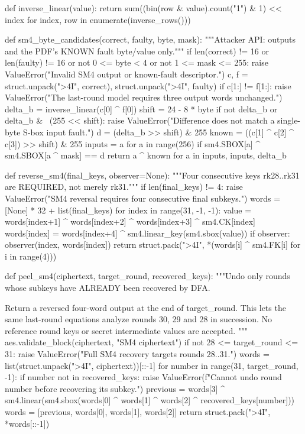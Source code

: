 \begin{lightcode}[numbers=left,firstnumber=1]
def inverse_linear(value):
    return sum((bin(row & value).count("1") & 1) << index for index, row in enumerate(inverse_rows()))


def sm4_byte_candidates(correct, faulty, byte, mask):
    """Attacker API: outputs and the PDF's KNOWN fault byte/value only."""
    if len(correct) != 16 or len(faulty) != 16 or not 0 <= byte < 4 or not 1 <= mask <= 255:
        raise ValueError("Invalid SM4 output or known-fault descriptor.")
    c, f = struct.unpack(">4I", correct), struct.unpack(">4I", faulty)
    if c[1:] != f[1:]:
        raise ValueError("The last-round model requires three output words unchanged.")
    delta_b = inverse_linear(c[0] ^ f[0])
    shift = 24 - 8 * byte
    if not delta_b or delta_b & ~(255 << shift):
        raise ValueError("Difference does not match a single-byte S-box input fault.")
    d = (delta_b >> shift) & 255
    known = ((c[1] ^ c[2] ^ c[3]) >> shift) & 255
    inputs = {a for a in range(256) if sm4.SBOX[a] ^ sm4.SBOX[a ^ mask] == d}
    return {a ^ known for a in inputs}, inputs, delta_b


def reverse_sm4(final_keys, observer=None):
    """Four consecutive keys rk28..rk31 are REQUIRED, not merely rk31."""
    if len(final_keys) != 4:
        raise ValueError("SM4 reversal requires four consecutive final subkeys.")
    words = [None] * 32 + list(final_keys)
    for index in range(31, -1, -1):
        value = words[index+1] ^ words[index+2] ^ words[index+3] ^ sm4.CK[index]
        words[index] = words[index+4] ^ sm4.linear_key(sm4.sbox(value))
        if observer:
            observer(index, words[index])
    return struct.pack(">4I", *(words[i] ^ sm4.FK[i] for i in range(4)))


def peel_sm4(ciphertext, target_round, recovered_keys):
    """Undo only rounds whose subkeys have ALREADY been recovered by DFA.

    Return a reversed four-word output at the end of target_round. This lets
    the same last-round equations analyze rounds 30, 29 and 28 in succession.
    No reference round keys or secret intermediate values are accepted.
    """
    aes.validate_block(ciphertext, "SM4 ciphertext")
    if not 28 <= target_round <= 31:
        raise ValueError("Full SM4 recovery targets rounds 28..31.")
    words = list(struct.unpack(">4I", ciphertext))[::-1]
    for number in range(31, target_round, -1):
        if number not in recovered_keys:
            raise ValueError(f"Cannot undo round {number} before recovering its subkey.")
        previous = words[3] ^ sm4.linear(sm4.sbox(words[0] ^ words[1] ^ words[2] ^ recovered_keys[number]))
        words = [previous, words[0], words[1], words[2]]
    return struct.pack(">4I", *words[::-1])



\end{lightcode}
